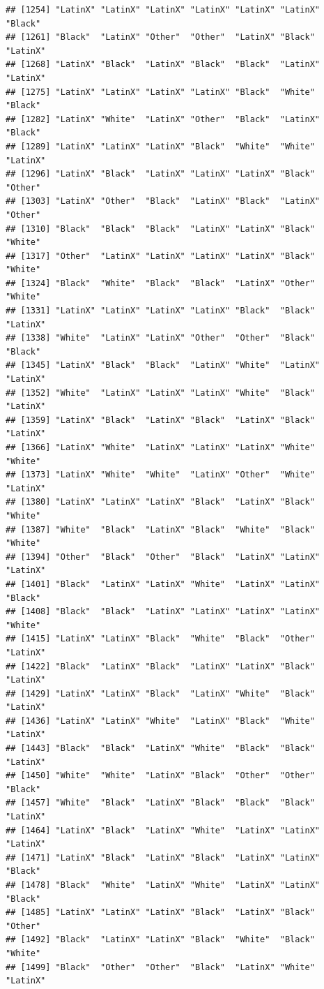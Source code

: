 \documentclass[]{book}
\begin{document}
\begin{verbatim}
## [1254] "LatinX" "LatinX" "LatinX" "LatinX" "LatinX" "LatinX" "Black" 
## [1261] "Black"  "LatinX" "Other"  "Other"  "LatinX" "Black"  "LatinX"
## [1268] "LatinX" "Black"  "LatinX" "Black"  "Black"  "LatinX" "LatinX"
## [1275] "LatinX" "LatinX" "LatinX" "LatinX" "Black"  "White"  "Black" 
## [1282] "LatinX" "White"  "LatinX" "Other"  "Black"  "LatinX" "Black" 
## [1289] "LatinX" "LatinX" "LatinX" "Black"  "White"  "White"  "LatinX"
## [1296] "LatinX" "Black"  "LatinX" "LatinX" "LatinX" "Black"  "Other" 
## [1303] "LatinX" "Other"  "Black"  "LatinX" "Black"  "LatinX" "Other" 
## [1310] "Black"  "Black"  "Black"  "LatinX" "LatinX" "Black"  "White" 
## [1317] "Other"  "LatinX" "LatinX" "LatinX" "LatinX" "Black"  "White" 
## [1324] "Black"  "White"  "Black"  "Black"  "LatinX" "Other"  "White" 
## [1331] "LatinX" "LatinX" "LatinX" "LatinX" "Black"  "Black"  "LatinX"
## [1338] "White"  "LatinX" "LatinX" "Other"  "Other"  "Black"  "Black" 
## [1345] "LatinX" "Black"  "Black"  "LatinX" "White"  "LatinX" "LatinX"
## [1352] "White"  "LatinX" "LatinX" "LatinX" "White"  "Black"  "LatinX"
## [1359] "LatinX" "Black"  "LatinX" "Black"  "LatinX" "Black"  "LatinX"
## [1366] "LatinX" "White"  "LatinX" "LatinX" "LatinX" "White"  "White" 
## [1373] "LatinX" "White"  "White"  "LatinX" "Other"  "White"  "LatinX"
## [1380] "LatinX" "LatinX" "LatinX" "Black"  "LatinX" "Black"  "White" 
## [1387] "White"  "Black"  "LatinX" "Black"  "White"  "Black"  "White" 
## [1394] "Other"  "Black"  "Other"  "Black"  "LatinX" "LatinX" "LatinX"
## [1401] "Black"  "LatinX" "LatinX" "White"  "LatinX" "LatinX" "Black" 
## [1408] "Black"  "Black"  "LatinX" "LatinX" "LatinX" "LatinX" "White" 
## [1415] "LatinX" "LatinX" "Black"  "White"  "Black"  "Other"  "LatinX"
## [1422] "Black"  "LatinX" "Black"  "LatinX" "LatinX" "Black"  "LatinX"
## [1429] "LatinX" "LatinX" "Black"  "LatinX" "White"  "Black"  "LatinX"
## [1436] "LatinX" "LatinX" "White"  "LatinX" "Black"  "White"  "LatinX"
## [1443] "Black"  "Black"  "LatinX" "White"  "Black"  "Black"  "LatinX"
## [1450] "White"  "White"  "LatinX" "Black"  "Other"  "Other"  "Black" 
## [1457] "White"  "Black"  "LatinX" "Black"  "Black"  "Black"  "LatinX"
## [1464] "LatinX" "Black"  "LatinX" "White"  "LatinX" "LatinX" "LatinX"
## [1471] "LatinX" "Black"  "LatinX" "Black"  "LatinX" "LatinX" "Black" 
## [1478] "Black"  "White"  "LatinX" "White"  "LatinX" "LatinX" "Black" 
## [1485] "LatinX" "LatinX" "LatinX" "Black"  "LatinX" "Black"  "Other" 
## [1492] "Black"  "LatinX" "LatinX" "Black"  "White"  "Black"  "White" 
## [1499] "Black"  "Other"  "Other"  "Black"  "LatinX" "White"  "LatinX"

\end{verbatim}
\end{document}
